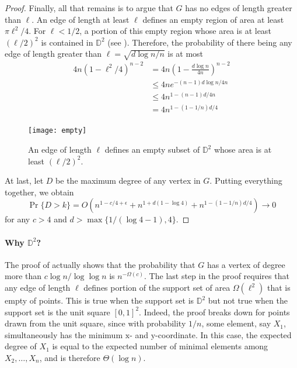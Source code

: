 \documentclass[lotsofwhite,charterfonts]{patmorin}
\newcommand{\D}{\mathbb{D}}
\begin{document}
\begin{proof}
Finally, all that remains is to argue that $G$ has no edges of length
greater than $\ell$.  An edge of length at least $\ell$ defines an empty
region of area at least $\pi\ell^2/4$.  For $\ell < 1/2$, a portion of
this empty region whose area is at least $(\ell/2)^2$ is contained in
$\D^2$ (see ).  Therefore, the probability of there being
any edge of length greater than $\ell=\sqrt{d\log n/n}$ is at most
\[
 \begin{aligned}
   4n(1-\ell^2/4)^{n-2} 
    &  =  4n\left(1-\frac{d\log n}{4n}\right)^{n-2} \\
    & \le 4ne^{-(n-1)d\log n/4n} \\
    & \le 4n^{1-(n-1)d/4n} \\
    & = 4n^{1-(1-1/n)d/4} \\
 \end{aligned}
\]

\begin{figure}
  \begin{center}
    \texttt{[image: empty]}
  \end{center}
  \caption{An edge of length $\ell$ defines an empty subset of $\D^2$ whose
  area is at least $(\ell/2)^2$.}
\end{figure}

At last, let $D$ be the maximum degree of any vertex in $G$.  Putting
everything together, we obtain
\[
   \Pr\{D > k\} = O(n^{1-c/4+\epsilon} 
                      + n^{1+d(1-\log 4)}
                      + n^{1-(1-1/n)d/4} )  \rightarrow 0
\]
for any
$c > 4$ and $d>\max\{1/(\log 4-1),4\}$.
\end{proof}

\paragraph{Why $\D^2$?} 
The proof of  actually shows that the
probability that $G$ has a vertex of degree more than $c\log n/\log\log n$
is $n^{-\Omega(c)}$.  The last step in the proof requires that any edge of
length $\ell$ defines portion of the support set of area $\Omega(\ell^2)$
that is empty of points.  This is true when the support set is $\D^2$
but not true when the support set is the unit square $[0,1]^2$.
Indeed, the proof breaks down for points drawn from the unit square,
since with probability $1/n$, some element, say $X_1$, simultaneously
has the minimum $\mathrm x$- and $\mathrm y$-coordinate.  In this case,
the expected degree of $X_1$ is equal to the expected number of minimal
elements among $X_2,\ldots,X_n$, and is therefore $\Theta(\log n)$.
\end{document}
